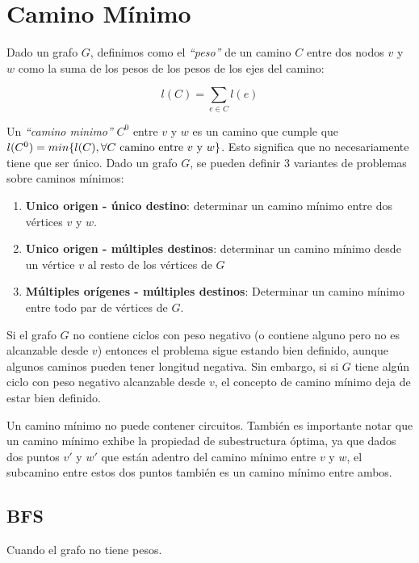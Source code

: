 \newpage
\section{Camino M\'inimo}

Dado un grafo $G$, definimos como el \emph{``peso''} de un camino $C$ entre dos nodos $v$ y $w$ como la suma de los pesos de los pesos de los ejes del camino:

\begin{equation}
l(C) = \sum_{e \in C} l(e)
\end{equation}

Un \emph{``camino minimo''} $C^0$ entre $v$ y $w$ es un camino que cumple que $l(C^0) = min \{ l(C), \forall \textrm{$ C$ camino entre $v$ y $w$}  \}$. Esto significa que no necesariamente tiene que ser \'unico. Dado un grafo $G$, se pueden definir 3 variantes de problemas sobre caminos m\'inimos:

\begin{enumerate}
\item \textbf{Unico origen - \'unico destino}: determinar un camino m\'inimo entre dos v\'ertices $v$ y $w$.
\item \textbf{Unico origen - m\'ultiples destinos}: determinar un camino m\'inimo desde un v\'ertice $v$ al resto de los v\'ertices de $G$
\item \textbf{M\'ultiples or\'igenes - m\'ultiples destinos}: Determinar un camino m\'inimo entre todo par de v\'ertices de $G$.
\end{enumerate}

Si el grafo $G$ no contiene ciclos con peso negativo (o contiene alguno pero no es alcanzable desde $v$) entonces el problema sigue estando bien definido, aunque algunos caminos pueden tener longitud negativa. Sin embargo, si si $G$ tiene alg\'un ciclo con peso negativo alcanzable desde $v$, el concepto de camino m\'inimo deja de estar bien definido.

Un camino m\'inimo no puede contener circuitos. Tambi\'en es importante notar que un camino m\'inimo exhibe la propiedad de subestructura \'optima, ya que dados dos puntos $v'$ y $w'$ que est\'an adentro del camino m\'inimo entre $v$ y $w$, el subcamino entre estos dos puntos tambi\'en es un camino m\'inimo entre ambos.

\subsection{BFS}

Cuando el grafo no tiene pesos.

